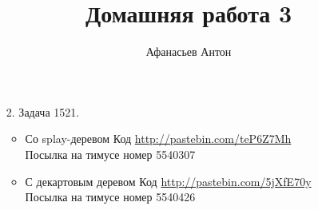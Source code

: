 \documentclass[10pt]{article}
\begin{document}
\title{Домашняя работа 3}
\author{Афанасьев Антон}
\maketitle

\begin{enumerate}
	\item[2.] Задача 1521. 
	
	\begin{itemize}
	\item Со splay-деревом
		Код \url{http://pastebin.com/teP6Z7Mh} \\
		Посылка на тимусе номер 5540307
	\item С декартовым деревом
		Код \url{http://pastebin.com/5jXfE70y} \\
		Посылка на тимусе номер 5540426
	\end{itemize}
\end{enumerate}
\end{document}
